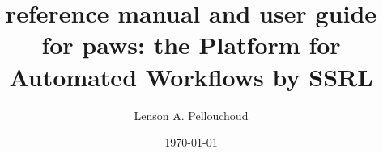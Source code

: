 \documentclass{report}
\begin{document}
	\title{reference manual and user guide for paws: the Platform for Automated Workflows by SSRL}
	\author{Lenson A. Pellouchoud}
	\date{\today}	
	\maketitle

	
	
    
	
    
    
\end{document}
